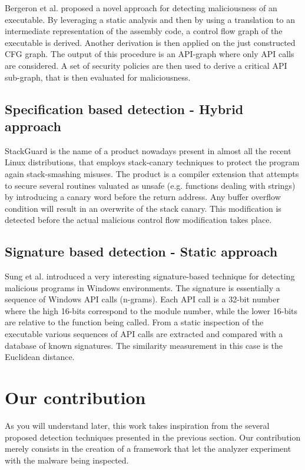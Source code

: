 \documentclass{article}
\begin{document}
Bergeron et al. proposed a novel approach for detecting maliciousness of an executable. By leveraging a static analysis and then by using a translation to an intermediate representation of the assembly code, a control flow graph of the executable is derived. Another derivation is then applied on the just constructed CFG graph. The output of this procedure is an API-graph where only API calls are considered. A set of security policies are then used to derive a critical API sub-graph, that is then evaluated for maliciousness.


\subsection{Specification based detection - Hybrid approach}

StackGuard \cite{Cowan} is the name of a product nowadays present in almost all the recent Linux distributions, that employs stack-canary techniques to protect the program again stack-smashing misuses. The product is a compiler extension that attempts to secure several routines valuated as unsafe (e.g. functions dealing with strings) by introducing a canary word before the return address. Any buffer overflow condition will result in an overwrite of the stack canary. This modification is detected before the actual malicious control flow modification takes place.

\subsection{Signature based detection - Static approach}

Sung et al. \cite{SAV} introduced a very interesting signature-based technique for detecting malicious programs in Windows environments. The signature is essentially a sequence of Windows API calls (n-grams). Each API call is a 32-bit number where the high 16-bits correspond to the module number, while the lower 16-bits are relative to the function being called. From a static inspection of the executable various sequences of API calls are extracted and compared with a database of known signatures. The similarity measurement in this case is the Euclidean distance.

\section{Our contribution}

As you will understand later, this work takes inspiration from the several proposed detection techniques presented in the previous section. Our contribution merely consists in the creation of a framework that let the analyzer experiment with the malware being inspected.
\end{document}
